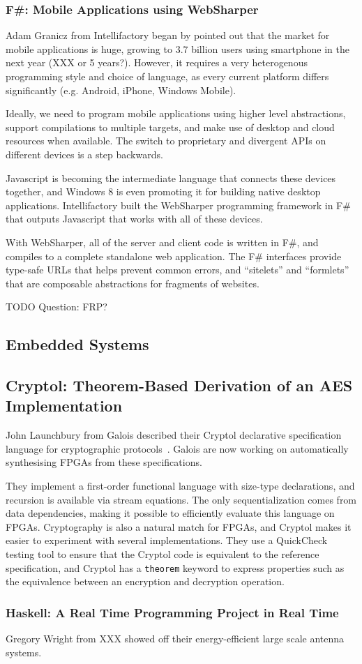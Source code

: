 \documentclass{jfp1}
\begin{document}
\subsubsection{F\#: Mobile Applications using WebSharper}

Adam Granicz from Intellifactory began by pointed out that the market for
mobile applications is huge, growing to 3.7 billion users using smartphone in
the next year (XXX or 5 years?).  However, it requires a very heterogenous
programming style and choice of language, as every current platform differs
significantly (e.g. Android, iPhone, Windows Mobile).

Ideally, we need to program mobile applications using higher level
abstractions, support compilations to multiple targets, and make use of desktop
and cloud resources when available. The switch to proprietary and divergent 
APIs on different devices is a step backwards.

Javascript is becoming the intermediate language that connects these devices
together, and Windows 8 is even promoting it for building native desktop
applications. Intellifactory built the WebSharper programming framework in F\#
that outputs Javascript that works with all of these devices.

With WebSharper, all of the server and client code is written in F\#, and
compiles to a complete standalone web application. The F\# interfaces provide
type-safe URLs that helps prevent common errors, and ``sitelets'' and
``formlets'' that are composable abstractions for fragments of websites.

TODO Question: FRP?

\subsection{Embedded Systems}

\subsection{Cryptol: Theorem-Based Derivation of an AES Implementation}

John Launchbury from Galois described their Cryptol declarative specification language
for cryptographic protocols~\cite{xxx}. Galois are now working on automatically
synthesising FPGAs from these specifications.

They implement a first-order functional language with size-type declarations,
and recursion is available via stream equations.  The only sequentialization
comes from data dependencies, making it possible to efficiently evaluate this
language on FPGAs. Cryptography is also a natural match for FPGAs, and Cryptol
makes it easier to experiment with several implementations. They use a
QuickCheck~\cite{x} testing tool to ensure that the Cryptol code is equivalent
to the reference specification, and Cryptol has a {\tt theorem} keyword to
express properties such as the equivalence between an encryption and decryption
operation.

\subsubsection{Haskell: A Real Time Programming Project in Real Time}

Gregory Wright from XXX showed off their energy-efficient large scale antenna
systems.  

 
\end{document}

